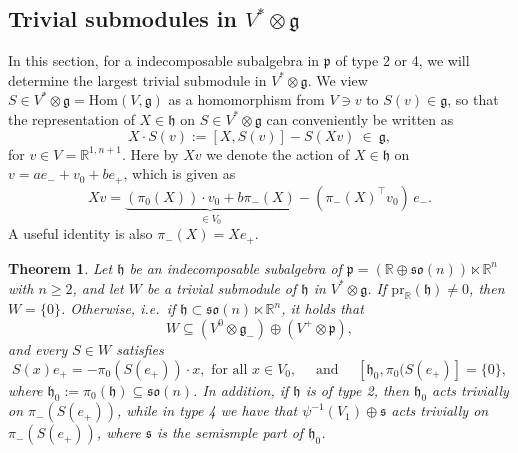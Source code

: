 \documentclass[11pt,a4paper]{amsart}
\newcommand{\p}{\mathfrak{p}}
\newcommand{\g}{\mathfrak{g}}
\newcommand{\h}{\mathfrak{h}}
\newcommand{\s}{\mathfrak{s}}
\newcommand{\+}{\oplus}
\newcommand{\so}{\mathfrak{so}}
\newcommand{\1}{\mathbf{1}}
\newcommand{\R}{\mathbb{R}} %
\newcommand{\<}{\langle}
\renewcommand{\>}{\rangle}
\theoremstyle{definition}
\theoremstyle{plain}
\newtheorem{theorem}[definition]{Theorem}
\numberwithin{equation}{section}
\begin{document}
\subsection{Trivial submodules in $V^*\otimes \g$}

In this section, for a  indecomposable subalgebra in $\p$ of type 2 or 4,  we will determine the largest trivial submodule in $V^*\otimes \g$. 
We view $S\in V^*\otimes \g=\mathrm{Hom}(V,\g)$ as a homomorphism from $V\ni v$ to $S(v)\in\g$, so 
 that the representation of $X\in\h$ on $S\in V^*\otimes \g$ can conveniently be written as
\[ X\cdot S (v):=[X,S(v)] -S(Xv)\ \in \ \g,\]
for $v\in V=\R^{1,n+1}$. Here by $Xv$ we denote the action of $X\in \h$ on $v=a e_- +v_0+ be_+$, which is given as
\[Xv= \underbrace{(\pi_0(X)) \cdot v_0 +b \pi_-(X) }_{\in V_0} - (\pi_-(X)^\top v_0 )\,e_-.\]
A useful identity is also 
$\pi_-(X)=Xe_+$.
\begin{theorem}\label{algtheo}
Let $\h$ be an indecomposable subalgebra of $\p=(\R\+\so(n))\ltimes \R^n$ with $n\ge 2$,  and let $W$ be a trivial submodule of $\h$ in $V^*\otimes \g$.
If $\mathrm{pr}_\R(\h)\not=0$, then $W=\{0\}$. Otherwise, i.e.~if $\h\subset \so(n)\ltimes \R^n$, it holds that
\[W\subseteq (V^0\otimes \g_-) \+ (V^+\otimes \p),\] and every $S\in W$ satisfies
\begin{equation}\label{algtheoequ}S(x)e_+ =-\pi_0(S(e_+))\cdot x,  \text{ for all }x\in V_0,\quad \text{ and }\quad \left[ \h_0 , \pi_0(S(e_+)\right]=\{0\},\end{equation}
where $\h_0:=\pi_0(\h) \subseteq \so(n)$.
In addition, if $\h$ is of type 2, then $\h_0$ acts trivially on $ \pi_-(S(e_+))$, while in type 4 we have that
$\psi^{-1}(V_1)\+\s$ acts trivially on $\pi_-(S(e_+))$, where $\s$ is the semismple part of $\h_0$.
\end{theorem}
\end{document}
